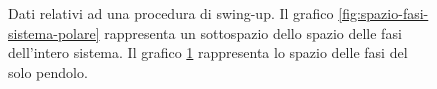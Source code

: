 \begin{figure}
\begin{subfigure}[]{\textwidth}
        \label{fig:spazio-fasi-pendolo-polare}
    \end{subfigure}

    \caption[Dati di una procedura di swing-up]{
        Dati relativi ad una procedura di swing-up. Il grafico
        \ref{fig:spazio-fasi-sistema-polare} rappresenta un sottospazio dello
        spazio delle fasi dell'intero sistema. Il grafico
        \ref{fig:spazio-fasi-pendolo-polare} rappresenta lo spazio delle fasi del
        solo pendolo.
    }
    \label{fig:swingup-real-one}
\end{figure}



